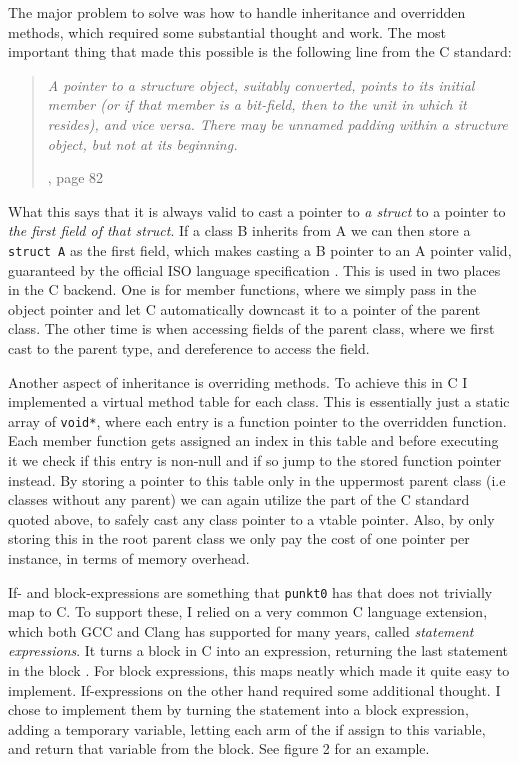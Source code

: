 The major problem to solve was how to handle inheritance and overridden methods, which required some substantial thought and work. The most important thing that made this possible is the following line from the C standard:
\begin{quote}
    \textit{A pointer to a structure object, suitably converted, points to its initial member (or if that member is a bit-field, then to the unit in which it resides), and vice versa. There may be unnamed padding within a structure object, but not at its beginning.}
    
    \cite{c17-standard}, page 82
\end{quote}
What this says that it is always valid to cast a pointer to \textit{a struct} to a pointer to \textit{the first field of that struct}. If a class B inherits from A we can then store a \texttt{struct A} as the first field, which makes casting a B pointer to an A pointer valid, guaranteed by the official ISO language specification \cite{c17-standard}. This is used in two places in the C backend. One is for member functions, where we simply pass in the object pointer and let C automatically downcast it to a pointer of the parent class. The other time is when accessing fields of the parent class, where we first cast to the parent type, and dereference to access the field.

Another aspect of inheritance is overriding methods. To achieve this in C I implemented a virtual method table for each class. This is essentially just a static array of \texttt{void*}, where each entry is a function pointer to the overridden function. Each member function gets assigned an index in this table and before executing it we check if this entry is non-null and if so jump to the stored function pointer instead. By storing a pointer to this table only in the uppermost parent class (i.e classes without any parent) we can again utilize the part of the C standard quoted above, to safely cast any class pointer to a vtable pointer. Also, by only storing this in the root parent class we only pay the cost of one pointer per instance, in terms of memory overhead.

If- and block-expressions are something that \texttt{punkt0} has that does not trivially map to C. To support these, I relied on a very common C language extension, which both GCC and Clang has supported for many years, called \textit{statement expressions}. It turns a block in C into an expression, returning the last statement in the block \cite{gcc-stmt-exprs}. For block expressions, this maps neatly which made it quite easy to implement. If-expressions on the other hand required some additional thought. I chose to implement them by turning the statement into a block expression, adding a temporary variable, letting each arm of the if assign to this variable, and return that variable from the block. See figure 2 for an example.

